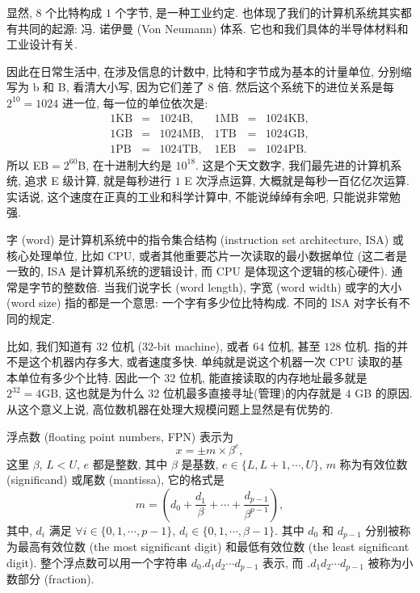 \documentclass[a4paper]{ctexart}
\begin{document}
{显然, $8$ 个比特构成 $1$ 个字节, 是一种工业约定.
也体现了我们的计算机系统其实都有共同的起源: 冯. 诺伊曼 (Von Neumann)
体系. 它也和我们具体的半导体材料和工业设计有关.

因此在日常生活中, 在涉及信息的计数中, 比特和字节成为基本的计量单位,
分别缩写为 b 和 B, 看清大小写, 因为它们差了 $8$ 倍.
然后这个系统下的进位关系是每 $2^{10} = 1024$ 进一位, 每一位的单位依次是:
$$
\begin{array}{rcllrcl}
1 \mbox{KB} &=& 1024 \mbox{B},& 1 \mbox{MB} &=& 1024 \mbox{KB},\\
1 \mbox{GB} &=& 1024 \mbox{MB},& 1 \mbox{TB} &=& 1024 \mbox{GB},\\
1 \mbox{PB} &=& 1024 \mbox{TB},& 1 \mbox{EB} &=& 1024 \mbox{PB}.
\end{array}
$$
所以 EB$=2^{60}$B, 在十进制大约是 $10^{18}$. 这是个天文数字,
我们最先进的计算机系统, 追求 E 级计算, 就是每秒进行 $1$ E 次浮点运算,
大概就是每秒一百亿亿次运算. 实话说, 这个速度在正真的工业和科学计算中,
不能说绰绰有余吧, 只能说非常勉强.

 字 (word) 是计算机系统中的指令集合结构
(instruction set architecture, ISA) 或核心处理单位, 比如 CPU,
或者其他重要芯片一次读取的最小数据单位 (这二者是一致的, ISA 是计算机系统的逻辑设计,
而 CPU 是体现这个逻辑的核心硬件). 通常是字节的整数倍.
当我们说字长 (word length), 字宽 (word width) 或字的大小 (word size)
指的都是一个意思: 一个字有多少位比特构成. 不同的 ISA 对字长有不同的规定.

 比如, 我们知道有 $32$ 位机 (32-bit machine),
或者 $64$ 位机, 甚至 $128$ 位机. 指的并不是这个机器内存多大, 或者速度多快.
单纯就是说这个机器一次 CPU 读取的基本单位有多少个比特. 因此一个 $32$ 位机,
能直接读取的内存地址最多就是 $2^{32} = 4\mbox{GB}$,
这也就是为什么 $32$ 位机最多直接寻址(管理)的内存就是 $4$ GB 的原因.
从这个意义上说, 高位数机器在处理大规模问题上显然是有优势的. 

 浮点数 (floating point numbers, FPN)
表示为
$$
x = \pm m \times \beta^e,
$$
这里 $\beta$, $L < U$, $e$ 都是整数, 其中 $\beta$ 是基数,
$e \in \{L, L + 1, \cdots, U\}$,
$m$ 称为有效位数 (significand) 或尾数 (mantissa), 它的格式是
$$
m = \left(d_0 + \frac{d_1}{\beta} + \cdots
+ \frac{d_{p - 1}}{\beta^{p - 1}}\right),
$$
其中, $d_i$ 满足 $\forall i \in \{0, 1, \cdots, p - 1\}$,
$d_i \in \{0, 1, \cdots, \beta - 1\}$. 其中 $d_0$ 和
$d_{p - 1}$ 分别被称为最高有效位数 (the most significant digit)
和最低有效位数 (the least significant digit).
整个浮点数可以用一个字符串 $d_0.d_1d_2\cdots d_{p - 1}$ 表示, 而
$.d_1d_2\cdots d_{p - 1}$ 被称为小数部分 (fraction).

}
\end{document}
